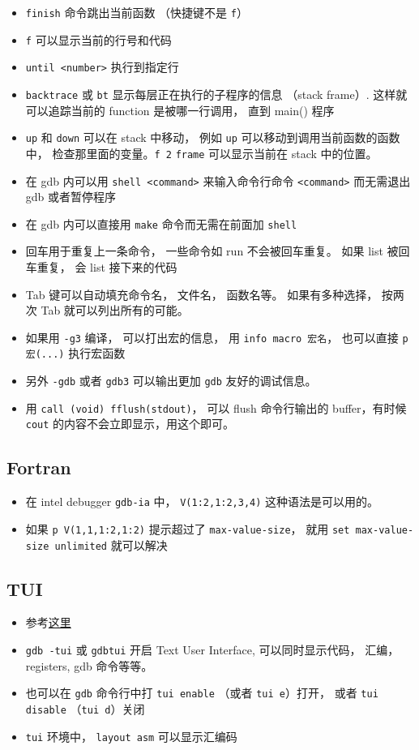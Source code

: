 \begin{itemize}
\item \verb`finish` 命令跳出当前函数 （快捷键不是 \verb`f`）
\item \verb`f` 可以显示当前的行号和代码
\item \verb`until <number>` 执行到指定行
\item \verb`backtrace` 或 \verb`bt` 显示每层正在执行的子程序的信息 （stack frame）. 这样就可以追踪当前的 function 是被哪一行调用， 直到 main() 程序
\item \verb`up` 和 \verb`down` 可以在 stack 中移动， 例如 \verb`up` 可以移动到调用当前函数的函数中， 检查那里面的变量。\verb`f 2` \verb`frame` 可以显示当前在 stack 中的位置。
\item 在 gdb 内可以用 \verb`shell <command>` 来输入命令行命令 \verb`<command>` 而无需退出 gdb 或者暂停程序
\item 在 gdb 内可以直接用 \verb`make` 命令而无需在前面加 \verb`shell`
\item 回车用于重复上一条命令， 一些命令如 run 不会被回车重复。 如果 list 被回车重复， 会 list 接下来的代码
\item Tab 键可以自动填充命令名， 文件名， 函数名等。 如果有多种选择， 按两次 Tab 就可以列出所有的可能。
\item 如果用 \verb`-g3` 编译， 可以打出宏的信息， 用 \verb`info macro 宏名`， 也可以直接 \verb`p 宏(...)` 执行宏函数
\item 另外 \verb`-gdb` 或者 \verb`gdb3` 可以输出更加 \verb`gdb` 友好的调试信息。
\item 用 \verb`call (void) fflush(stdout)`， 可以 flush 命令行输出的 buffer，有时候 \verb`cout` 的内容不会立即显示，用这个即可。
\end{itemize}

\subsection{Fortran}
\begin{itemize}
\item 在 intel debugger \verb`gdb-ia` 中， \verb`V(1:2,1:2,3,4)` 这种语法是可以用的。
\item 如果 \verb`p V(1,1,1:2,1:2)` 提示超过了 \verb`max-value-size`， 就用 \verb`set max-value-size unlimited` 就可以解决
\end{itemize}

\subsection{TUI}
\begin{itemize}
\item 参考\href{https://developer.apple.com/library/archive/documentation/DeveloperTools/gdb/gdb/gdb_toc.html#TOC229}{这里}
\item \verb`gdb -tui` 或 \verb`gdbtui` 开启 Text User Interface, 可以同时显示代码， 汇编， registers, gdb 命令等等。
\item 也可以在 \verb`gdb` 命令行中打 \verb`tui enable` （或者 \verb`tui e`）打开， 或者 \verb`tui disable` （\verb`tui d`）关闭
\item \verb`tui` 环境中， \verb`layout asm` 可以显示汇编码
\end{itemize}


